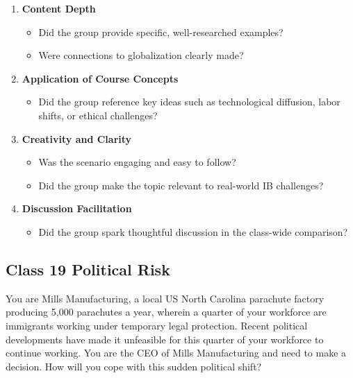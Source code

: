 \documentclass[
  11pt,
]{article}
\providecommand{\tightlist}{%
  \setlength{\itemsep}{0pt}\setlength{\parskip}{0pt}}
\begin{document}
\begin{enumerate}
\def\labelenumi{\arabic{enumi}.}
\tightlist
\item
  \textbf{Content Depth}

  \begin{itemize}
  \tightlist
  \item
    Did the group provide specific, well-researched examples?
  \item
    Were connections to globalization clearly made?
  \end{itemize}
\item
  \textbf{Application of Course Concepts}

  \begin{itemize}
  \tightlist
  \item
    Did the group reference key ideas such as technological diffusion,
    labor shifts, or ethical challenges?
  \end{itemize}
\item
  \textbf{Creativity and Clarity}

  \begin{itemize}
  \tightlist
  \item
    Was the scenario engaging and easy to follow?
  \item
    Did the group make the topic relevant to real-world IB challenges?
  \end{itemize}
\item
  \textbf{Discussion Facilitation}

  \begin{itemize}
  \tightlist
  \item
    Did the group spark thoughtful discussion in the class-wide
    comparison?
  \end{itemize}
\end{enumerate}

\subsection{Class 19 Political Risk}\label{class-19-political-risk}

You are Mills Manufacturing, a local US North Carolina parachute factory
producing 5,000 parachutes a year, wherein a quarter of your workforce
are immigrants working under temporary legal protection. Recent
political developments have made it unfeasible for this quarter of your
workforce to continue working. You are the CEO of Mills Manufacturing
and need to make a decision. How will you cope with this sudden
political shift?
\end{document}
